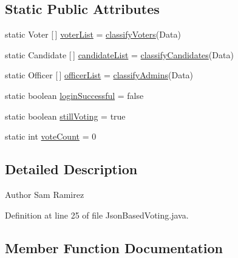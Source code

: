 \subsection*{Static Public Attributes}
\begin{DoxyCompactItemize}
\item 
static Voter \mbox{[}$\,$\mbox{]} \mbox{\hyperlink{classjsonbasedvoting_1_1_json_based_voting_a50b66e1d5c92322631fc26d0d607172e}{voter\+List}} = \mbox{\hyperlink{classjsonbasedvoting_1_1_json_based_voting_a6f76956192c5ec8d7704c20bcc967d91}{classify\+Voters}}(Data)
\item 
static Candidate \mbox{[}$\,$\mbox{]} \mbox{\hyperlink{classjsonbasedvoting_1_1_json_based_voting_aeb1c0154551e24a6fe24fc6b71576924}{candidate\+List}} = \mbox{\hyperlink{classjsonbasedvoting_1_1_json_based_voting_a09a09c0673c510a648d225136e4cf259}{classify\+Candidates}}(Data)
\item 
static Officer \mbox{[}$\,$\mbox{]} \mbox{\hyperlink{classjsonbasedvoting_1_1_json_based_voting_a727f0bdc690e796c13428b4448be9456}{officer\+List}} = \mbox{\hyperlink{classjsonbasedvoting_1_1_json_based_voting_a8ae3b015105859acfa80cfcf3e481174}{classify\+Admins}}(Data)
\item 
static boolean \mbox{\hyperlink{classjsonbasedvoting_1_1_json_based_voting_af94e2555dca7bed41989b965a179a769}{login\+Successful}} = false
\item 
static boolean \mbox{\hyperlink{classjsonbasedvoting_1_1_json_based_voting_a560cc9720f1a7101b2e1cbdf2bbe7b76}{still\+Voting}} = true
\item 
static int \mbox{\hyperlink{classjsonbasedvoting_1_1_json_based_voting_a94c8b3fcebf88d5a739c9bc869160087}{vote\+Count}} = 0
\end{DoxyCompactItemize}


\subsection{Detailed Description}
\begin{DoxyAuthor}{Author}
Sam Ramirez 
\end{DoxyAuthor}


Definition at line 25 of file Json\+Based\+Voting.\+java.



\subsection{Member Function Documentation}
\mbox{\label{classjsonbasedvoting_1_1_json_based_voting_acc4af3eab668970e61d34f68d4df8e2b}} 
